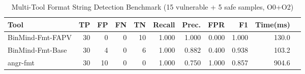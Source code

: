 \begin{table}[h]
\centering
\caption{Multi-Tool Format String Detection Benchmark (15 vulnerable + 5 safe samples, O0+O2)}
\label{tab:fmt_benchmark}
\begin{tabular}{lrrrrrrrrrr}
\toprule
Tool & TP & FP & FN & TN & Recall & Prec. & FPR & F1 & Time(ms) \\
\midrule
BinMind-Fmt-FAPV & 30 & 0 & 0 & 10 & 1.000 & 1.000 & 0.000 & 1.000 & 130.0 \\
BinMind-Fmt-Base & 30 & 4 & 0 & 6 & 1.000 & 0.882 & 0.400 & 0.938 & 103.2 \\
angr-fmt & 30 & 10 & 0 & 0 & 1.000 & 0.750 & 1.000 & 0.857 & 904.6 \\
\bottomrule
\end{tabular}
\end{table}